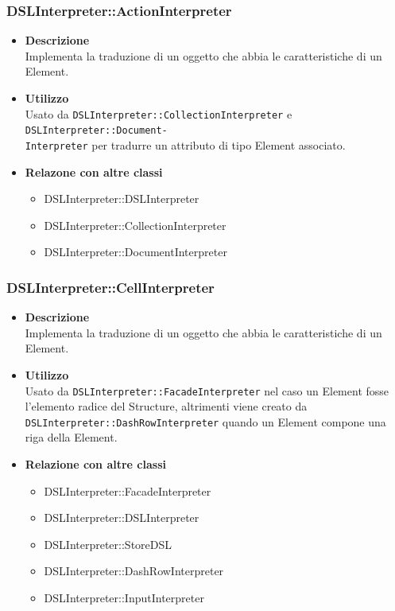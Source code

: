 \subsubsection{DSLInterpreter::ActionInterpreter}
\begin{itemize}
\item \textbf{Descrizione} \hfill \\
Implementa la traduzione di un oggetto che abbia le caratteristiche di un  Element.
\item \textbf{Utilizzo} \hfill \\
Usato da \texttt{DSLInterpreter::CollectionInterpreter} e \texttt{DSLInterpreter::Document-}\\\texttt{Interpreter} per tradurre un attributo di tipo  Element associato.
\item \textbf{Relazone con altre classi}
\begin{itemize}
\item DSLInterpreter::DSLInterpreter
\item DSLInterpreter::CollectionInterpreter
\item DSLInterpreter::DocumentInterpreter
\end{itemize}
\end{itemize}

\subsubsection{DSLInterpreter::CellInterpreter}
\begin{itemize}
\item \textbf{Descrizione} \hfill \\
Implementa la traduzione di un oggetto che abbia le caratteristiche di un  Element.
\item \textbf{Utilizzo} \hfill \\
Usato da \texttt{DSLInterpreter::FacadeInterpreter} nel caso un  Element fosse l'elemento radice del  Structure, altrimenti viene creato da \\\texttt{DSLInterpreter::DashRowInterpreter} quando un  Element compone una riga della  Element.
\item \textbf{Relazione con altre classi}
\begin{itemize}
\item DSLInterpreter::FacadeInterpreter
\item DSLInterpreter::DSLInterpreter
\item DSLInterpreter::StoreDSL
\item DSLInterpreter::DashRowInterpreter
\item DSLInterpreter::InputInterpreter
\end{itemize}
\end{itemize}

